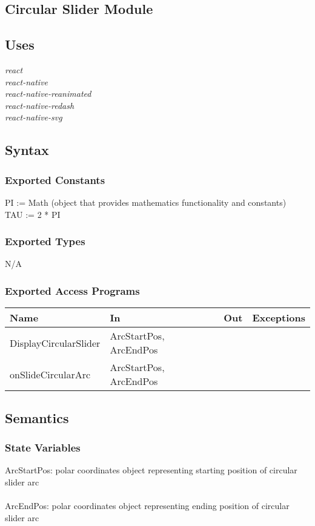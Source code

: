 \documentclass[12pt, titlepage]{article}
\begin{document}
\subsection{Circular Slider Module}

\subsection{Uses}
{\textit{react}}\\
{\textit{react-native}}\\
{\textit{react-native-reanimated}}\\
{\textit{react-native-redash}}\\
{\textit{react-native-svg}}

\subsection{Syntax}

\subsubsection{Exported Constants}
PI := Math (object that provides mathematics functionality and constants)\\
TAU := 2 * PI

\subsubsection{Exported Types}
N/A

\subsubsection{Exported Access Programs}

\begin{tabular}{| l | l | l | l |}
	\hline
	{\textbf{Name}} & {\textbf{In}} & {\textbf{Out}} & {\textbf{Exceptions}}\\
	\hline
	{DisplayCircularSlider} & ArcStartPos, ArcEndPos & & \\
	\hline
	{onSlideCircularArc} & ArcStartPos, ArcEndPos & & \\
	\hline
\end{tabular}

\subsection{Semantics}

\subsubsection{State Variables}
ArcStartPos: polar coordinates object representing starting position of circular slider arc\\\\
ArcEndPos: polar coordinates object representing ending position of circular slider arc
\end{document}
